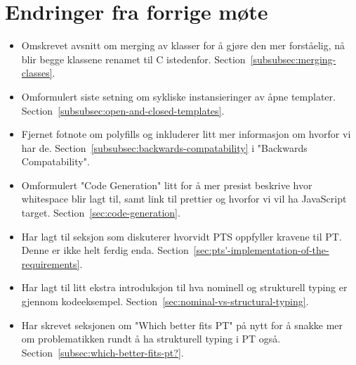 
\chapter*{Endringer fra forrige møte}

\begin{itemize}
    \item Omskrevet avsnitt om merging av klasser for å gjøre den mer forståelig, nå blir begge klassene renamet til C istedenfor.
    Section~\vref{subsubsec:merging-classes}.
    \item Omformulert siste setning om sykliske instansieringer av åpne templater.
    Section~\vref{subsubsec:open-and-closed-templates}.
    \item Fjernet fotnote om polyfills og inkluderer litt mer informasjon om hvorfor vi har de.
    Section~\vref{subsubsec:backwards-compatability} i "Backwards Compatability".
    \item Omformulert "Code Generation" litt for å mer presist beskrive hvor whitespace blir lagt til, samt link til prettier og hvorfor vi vil ha JavaScript target.
    Section~\vref{sec:code-generation}.
    \item Har lagt til seksjon som diskuterer hvorvidt PTS oppfyller kravene til PT.
    Denne er ikke helt ferdig enda.
    Section~\vref{sec:pts'-implementation-of-the-requirements}.
    \item Har lagt til litt ekstra introduksjon til hva nominell og strukturell typing er gjennom kodeeksempel.
    Section~\vref{sec:nominal-vs-structural-typing}.
    \item Har skrevet seksjonen om "Which better fits PT" på nytt for å snakke mer om problematikken rundt å ha strukturell typing i PT også.
    Section~\vref{subsec:which-better-fits-pt?}.

\end{itemize}

